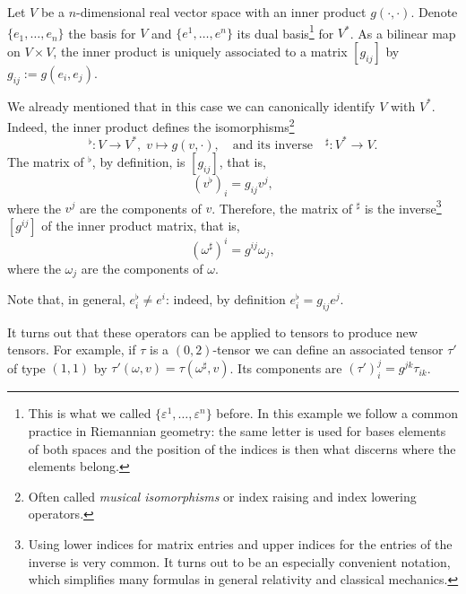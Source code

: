 \begin{example}\label{ex:musicaliso}
	Let $V$ be a $n$-dimensional real vector space with an inner product $g(\cdot, \cdot)$.
	Denote $\{e_1, \ldots, e_n\}$ the basis for $V$ and $\{e^1, \ldots, e^n\}$ its dual basis\footnote{This is what we called $\{\varepsilon^1, \ldots,\varepsilon^n\}$ before. In this example we follow a common practice in Riemannian geometry: the same letter is used for bases elements of both spaces and the position of the indices is then what discerns where the elements belong.} for $V^*$.
	As a bilinear map on $V\times V$, the inner product is uniquely associated to a matrix $[g_{ij}]$ by $g_{ij} := g(e_i, e_j)$.

	We already mentioned that in this case we can canonically identify $V$ with $V^*$.
	Indeed, the inner product defines the isomorphisms\footnote{Often called \emph{musical isomorphisms} or index raising and index lowering operators.}
	\begin{equation}
		{}^\flat: V \to V^*,\; v\mapsto g(v, \cdot),
		\quad\mbox{and its inverse}\quad
		{}^\sharp: V^*\to V.
	\end{equation}
	The matrix of ${}^\flat$, by definition, is $[g_{ij}]$, that is,
	\begin{equation}
		(v^\flat)_i = g_{ij} v^j,
	\end{equation}
	where the $v^j$ are the components of $v$.
	Therefore, the matrix of ${}^\sharp$ is the inverse\footnote{Using lower indices for matrix entries and upper indices for the entries of the inverse is very common. It turns out to be an especially convenient notation, which simplifies many formulas in general relativity and classical mechanics.} $[g^{ij}]$ of the inner product matrix, that is,
	\begin{equation}
		(\omega^\sharp)^i = g^{ij}\omega_j,
	\end{equation}
	where the $\omega_j$ are the components of $\omega$.

	Note that, in general, $e^\flat_i\neq e^i$: indeed, by definition $e^\flat_i = g_{ij}e^j$.

	It turns out that these operators can be applied to tensors to produce new tensors.
	For example, if $\tau$ is a $(0,2)$-tensor we can define an associated tensor $\tau'$ of type $(1,1)$ by $\tau'(\omega, v) = \tau(\omega^\sharp, v)$.
	Its components are $(\tau')_i^j = g^{jk}\tau_{ik}$.
\end{example}


